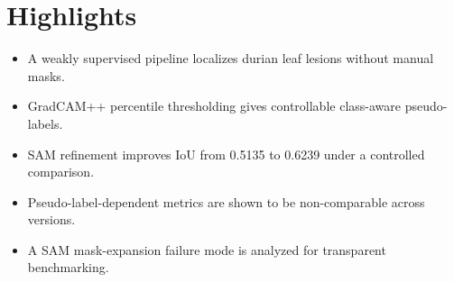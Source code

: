 \section*{Highlights}
\begin{itemize}
\item A weakly supervised pipeline localizes durian leaf lesions without manual masks.
\item GradCAM++ percentile thresholding gives controllable class-aware pseudo-labels.
\item SAM refinement improves IoU from 0.5135 to 0.6239 under a controlled comparison.
\item Pseudo-label-dependent metrics are shown to be non-comparable across versions.
\item A SAM mask-expansion failure mode is analyzed for transparent benchmarking.
\end{itemize}
